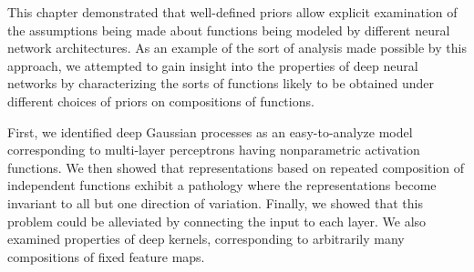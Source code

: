 This chapter demonstrated that well-defined priors allow explicit examination of the assumptions being made about functions being modeled by different neural network architectures.
As an example of the sort of analysis made possible by this approach, we attempted to gain insight into the properties of deep neural networks by characterizing the sorts of functions likely to be obtained under different choices of priors on compositions of functions.

First, we identified deep Gaussian processes as an easy-to-analyze model corresponding to multi-layer perceptrons having nonparametric activation functions.
%
We then showed that representations based on repeated composition of independent functions exhibit a pathology where the representations become invariant to all but one direction of variation. %
Finally, we showed that this problem could be alleviated by connecting the input to each layer.
%
We also examined properties of deep kernels, corresponding to arbitrarily many compositions of fixed feature maps.

